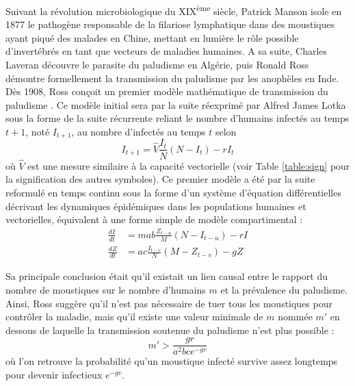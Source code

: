 Suivant la révolution microbiologique du XIX\textsuperscript{ème} siècle, Patrick Manson isole en 1877 le pathogène responsable de la filariose lymphatique dans des moustiques ayant piqué des malades en Chine, mettant en lumière le rôle possible d'invertébrés en tant que vecteurs de maladies humaines. 
A sa suite, Charles Laveran découvre le parasite du paludisme en Algérie, puis Ronald Ross démontre formellement la transmission du paludisme par les anophèles en Inde. 
Dès 1908, Ross conçoit un premier modèle mathématique de transmission du paludisme \cite{ross1908report,smith2012ross}.
Ce modèle initial sera par la suite réexprimé par Alfred James Lotka sous la forme de la suite récurrente reliant le nombre d'humains infectés au temps $t+1$, noté $I_{t+1}$, au nombre d'infectés au temps $t$ selon
\begin{equation}
I_{t+1} = \hat{V}\frac{I_t}{N}(N-I_t)-rI_t
\end{equation}
où $\hat{V}$ est une mesure similaire à la capacité vectorielle (voir Table \ref{table:sign} pour la signification des autres symboles). 
Ce premier modèle a été par la suite reformulé en temps continu sous la forme d'un système d'équation différentielles décrivant les dynamiques épidémiques dans les populations humaines et vectorielles, équivalent à une forme simple de modèle compartimental \cite{ross1911prevention,lotka1923contribution} :
\begin{align}
\frac{dI}{dt} &= mab\frac{Z_{t-u}}{M}(N-I_{t-u})-rI \\ \nonumber
\frac{dZ}{dt} &= ac\frac{I_{t-v}}{N}(M-Z_{t-v})-gZ
\end{align}

Sa principale conclusion était qu'il existait un lien causal entre le rapport du nombre de moustiques sur le nombre d'humains $m$ et la prévalence du paludisme. 
Ainsi, Ross suggère qu'il n'est pas nécessaire de tuer tous les moustiques pour contrôler la maladie, mais qu'il existe une valeur minimale de $m$ nommée $m'$ en dessous de laquelle la transmission soutenue du paludisme n'est plus possible :
\begin{equation}
m'>\frac{gr}{a^2bce^{-gv}}
\end{equation}
où l'on retrouve la probabilité qu'un moustique infecté survive assez longtemps pour devenir infectieux $e^{-gv}$.


